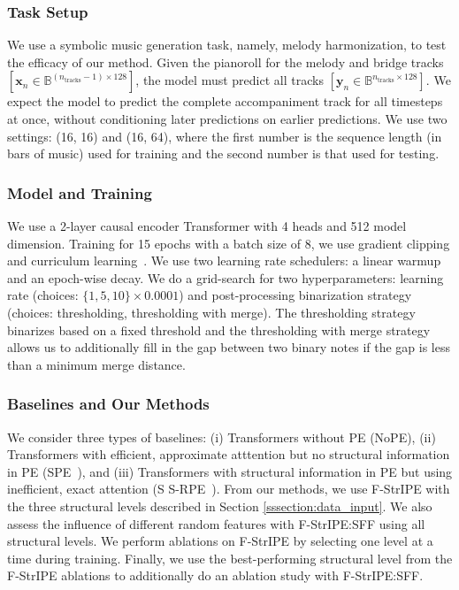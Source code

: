 \subsubsection{Task Setup}
We use a symbolic music generation task, namely, melody harmonization, to test the efficacy of our method. Given the pianoroll for the melody and bridge tracks $\left[ \mathbf{x}_n \in \mathbb{B}^{(n_\text{tracks} - 1) \times 128} \right]$, the model must predict all tracks $\left[ \mathbf{y}_n \in \mathbb{B}^{n_\text{tracks} \times 128} \right]$. We expect the model to predict the complete accompaniment track for all timesteps at once, without conditioning later predictions on earlier predictions. 
We use two settings: (16, 16) and (16, 64), where the first number is the sequence length (in bars of music) used for training and the second number is that used for testing.

\subsubsection{Model and Training}
We use a 2-layer causal encoder Transformer with 4 heads and 512 model dimension. Training for 15 epochs with a batch size of 8, we use gradient clipping and curriculum learning~\cite{bengio_curriculum_2009}. We use two learning rate schedulers: a linear warmup and an epoch-wise decay.
We do a grid-search for two hyperparameters: learning rate (choices: $\{ 1, 5, 10 \} \times 0.0001$) and post-processing binarization strategy~\cite{agarwal_structure_2024} (choices: thresholding, thresholding with merge). The thresholding strategy binarizes based on a fixed threshold and the thresholding with merge strategy allows us to additionally fill in the gap between two binary notes if the gap is less than a minimum merge distance.

\subsubsection{Baselines and Our Methods} \label{sssection:baselines}
We consider three types of baselines: (i) Transformers without PE (NoPE), (ii) Transformers with efficient, approximate atttention but no structural information in PE (SPE~\cite{liutkus_relative_2021}), and (iii) Transformers with structural information in PE but using inefficient, exact attention (S S-RPE~\cite{agarwal_structure_2024}).
From our methods, we use F-StrIPE with the three structural levels described in Section \ref{sssection:data_input}. We also assess the influence of different random features with F-StrIPE:SFF using all structural levels. 
We perform ablations on F-StrIPE by selecting one level at a time during training. Finally, we use the best-performing structural level from the F-StrIPE ablations to additionally do an ablation study with F-StrIPE:SFF.

